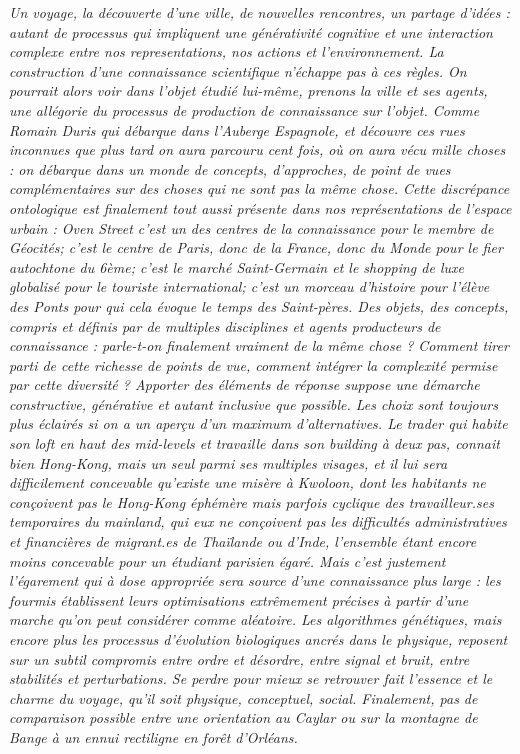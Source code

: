 \textit{Un voyage, la découverte d'une ville, de nouvelles rencontres, un partage d'idées : autant de processus qui impliquent une générativité cognitive et une interaction complexe entre nos representations, nos actions et l'environnement. La construction d'une connaissance scientifique n'échappe pas à ces règles. On pourrait alors voir dans l'objet étudié lui-même, prenons la ville et ses agents, une allégorie du processus de production de connaissance sur l'objet. Comme Romain Duris qui débarque dans l'Auberge Espagnole, et découvre ces rues inconnues que plus tard on aura parcouru cent fois, où on aura vécu mille choses : on débarque dans un monde de concepts, d'approches, de point de vues complémentaires sur des choses qui ne sont pas la même chose. Cette discrépance ontologique est finalement tout aussi présente dans nos représentations de l'espace urbain : \emph{Oven Street} c'est un des centres de la connaissance pour le membre de Géocités; c'est le centre de Paris, donc de la France, donc du Monde pour le fier autochtone du 6ème; c'est le marché Saint-Germain et le shopping de luxe globalisé pour le touriste international; c'est un morceau d'histoire pour l'élève des Ponts pour qui cela évoque le temps des Saint-pères. Des objets, des concepts, compris et définis par de multiples disciplines et agents producteurs de connaissance : parle-t-on finalement vraiment de la même chose ? Comment tirer parti de cette richesse de points de vue, comment intégrer la complexité permise par cette diversité ? Apporter des éléments de réponse suppose une démarche constructive, générative et autant inclusive que possible. Les choix sont toujours plus éclairés si on a un aperçu d'un maximum d'alternatives. Le trader qui habite son loft en haut des \emph{mid-levels} et travaille dans son building à deux pas, connait bien Hong-Kong, mais un seul parmi ses multiples visages, et il lui sera difficilement concevable qu'existe une misère à Kwoloon, dont les habitants ne conçoivent pas le Hong-Kong éphémère mais parfois cyclique des travailleur.ses temporaires du mainland, qui eux ne conçoivent pas les difficultés administratives et financières de migrant.es de Thaïlande ou d'Inde, l'ensemble étant encore moins concevable pour un étudiant parisien égaré. Mais c'est justement l'égarement qui à dose appropriée sera source d'une connaissance plus large : les fourmis établissent leurs optimisations extrêmement précises à partir d'une marche qu'on peut considérer comme aléatoire. Les algorithmes génétiques, mais encore plus les processus d'évolution biologiques ancrés dans le physique, reposent sur un subtil compromis entre ordre et désordre, entre signal et bruit, entre stabilités et perturbations. Se perdre pour mieux se retrouver fait l'essence et le charme du voyage, qu'il soit physique, conceptuel, social. Finalement, pas de comparaison possible entre une orientation au Caylar ou sur la montagne de Bange à un ennui rectiligne en forêt d'Orléans.}



